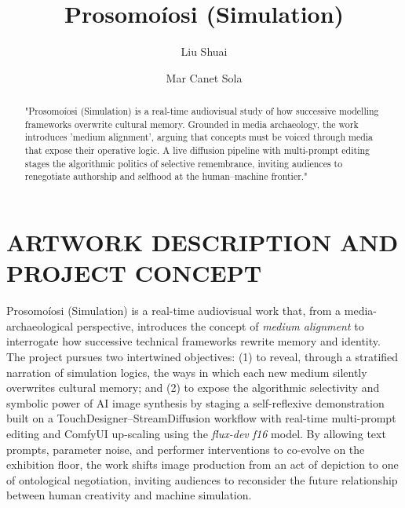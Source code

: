 \documentclass[sigconf,authordraft]{acmart}
\title{Prosomoíosi (Simulation)}
\author{Liu Shuai}
\affiliation{%
  \institution{Academy of Media Arts Cologne (KHM)}
  \city{Cologne}
  \country{Germany}}
\author{Mar Canet Sola}
\affiliation{%
  \institution{Baltic Film, Media and Arts School, Tallinn University}
  \city{Tallinn}
  \country{Estonia}}
\begin{document}
\begin{abstract}
"Prosomoíosi (Simulation) is a real-time audiovisual study of how successive modelling frameworks overwrite cultural memory. Grounded in media archaeology, the work introduces 'medium alignment', arguing that concepts must be voiced through media that expose their operative logic. A live diffusion pipeline with multi-prompt editing stages the algorithmic politics of selective remembrance, inviting audiences to renegotiate authorship and selfhood at the human–machine frontier."
\end{abstract}

\begin{CCSXML}
\end{CCSXML}



\maketitle



\section{ARTWORK DESCRIPTION AND PROJECT CONCEPT}
Prosomoíosi (Simulation) is a real-time audiovisual work that, from a media-archaeological perspective, introduces the concept of \emph{medium alignment} to interrogate how successive technical frameworks rewrite memory and identity. The project pursues two intertwined objectives: (1) to reveal, through a stratified narration of simulation logics, the ways in which each new medium silently overwrites cultural memory; and (2) to expose the algorithmic selectivity and symbolic power of AI image synthesis by staging a self-reflexive demonstration built on a TouchDesigner--StreamDiffusion workflow with real-time multi-prompt editing and ComfyUI up-scaling using the \textit{flux-dev f16} model. By allowing text prompts, parameter noise, and performer interventions to co-evolve on the exhibition floor, the work shifts image production from an act of depiction to one of ontological negotiation, inviting audiences to reconsider the future relationship between human creativity and machine simulation.
\end{document}
